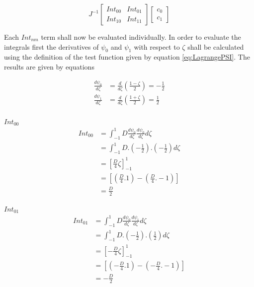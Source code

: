 \documentclass[11pt]{article}
\begin{document}
\begin{equation}
J^{-1}
\begin{bmatrix}

Int_{00} & Int_{01} \\
Int_{10} & Int_{11}
\end{bmatrix}
\begin{bmatrix}

c_{0} \\  c_{1} 
\end{bmatrix}
\end{equation}

Each $Int_{nm}$ term shall now be evaluated individually. In order to evaluate the integrals first the  derivatives of $\psi_0$ and $\psi_{1}$ with respect to $\zeta$ shall be calculated using the definition of the test function given by equation \ref{eq:LagrangePSI}. The results are given by equations 

\begin{subequations}
\label{eq:prematrix}
\begin{align}
\frac{d\psi_{0}}{d\zeta} &= \frac{d}{d\zeta}(\frac{1-\zeta}{2}) = -\frac{1}{2} \label{eq:psi0der}\\
\frac{d\psi_{1}}{d\zeta} &= \frac{d}{d\zeta}(\frac{1+\zeta}{2}) = \frac{1}{2} \label{eq:psi1der}
\end{align}
\end{subequations}
\\


\underline{$Int_{00}$} \\


\begin{equation}\label{eq:Int00}
\begin{split}
 Int_{00} &= \int_{-1}^{1} D \frac{d\psi_{0}}{d\zeta} \frac{d\psi_{0}}{d \zeta} d \zeta \\
&=  \int_{-1}^{1} D .( -\frac{1}{2}). (-\frac{1}{2}) d\zeta \\
& = \left[ \frac{D}{4} \zeta \right]_{-1}^{1} \\
& = \left[ (\frac{D}{4}.1) - (\frac{D}{4}.-1) \right] \\
& = \frac{D}{2}
\end{split}
\end{equation}

\underline{$Int_{01}$} \\


\begin{equation}\label{eq:Int01}
\begin{split}
 Int_{01} &= \int_{-1}^{1} D \frac{d\psi_{0}}{d\zeta} \frac{d\psi_{1}}{d \zeta} d \zeta \\
&=  \int_{-1}^{1} D .( -\frac{1}{2}). (\frac{1}{2}) d\zeta \\
& = \left[-\frac{D}{4} \zeta \right]_{-1}^{1} \\
& = \left[ (-\frac{D}{4}.1) - (-\frac{D}{4}.-1) \right] \\
& = -\frac{D}{2}
\end{split}
\end{equation}
\end{document}
